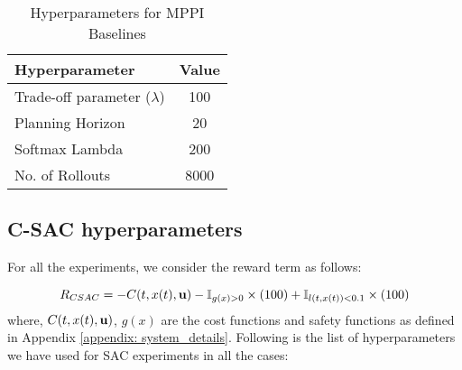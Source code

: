 \begin{table}[h]
    \centering
    \begin{tabular}{lc}
        \hline
        \textbf{Hyperparameter} & \textbf{Value} \\
        \hline
        Trade-off parameter ($\lambda$) & 100 \\
        Planning Horizon & 20 \\
        Softmax Lambda & 200 \\
        No. of Rollouts & 8000 \\
        \hline
        
        
    \end{tabular}
    \vspace{1em}
    \caption{Hyperparameters for MPPI Baselines}
    \label{tab:mppi_details}
\end{table}
\vspace{-2em}
\subsection{C-SAC hyperparameters}

For all the experiments, we consider the reward term as follows:

\begin{equation}
    R_{CSAC} = -C(t, x(t), \mathbf{u}) - \mathbb{I}_{g(x)>0}\times(100) + \mathbb{I}_{l(t, x(t))<0.1}\times(100) 
\end{equation}
where, $C(t,x(t), \mathbf{u})$, $g(x)$ are the cost functions and safety functions as defined in Appendix \ref{appendix: system_details}. Following is the list of hyperparameters we have used for SAC experiments in all the cases:

